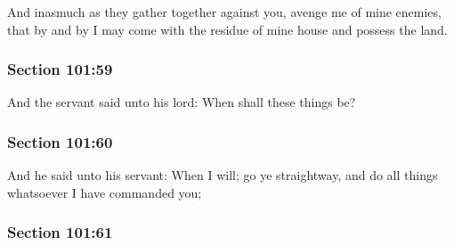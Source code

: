 		And inasmuch as they gather together against you, avenge me of mine enemies, that by and by I may come with the residue of mine house and possess the land.


	\subsubsection{Section 101:59} %
		\label{DC101-59}

		And the servant said unto his lord: When shall these things be?


	\subsubsection{Section 101:60} %
		\label{DC101-60}

		And he said unto his servant: When I will; go ye straightway, and do all things whatsoever I have commanded you;


	\subsubsection{Section 101:61} %
		\label{DC101-61}

